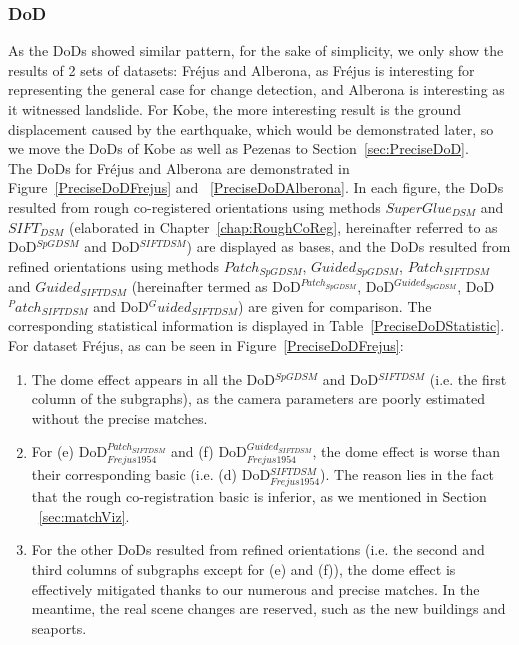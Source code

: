 \subsubsection{DoD}

As the \ac{DoD}s showed similar pattern, for the sake of simplicity, 
we only show the results of 2 sets of datasets: Fr{\'e}jus and Alberona, as Fr{\'e}jus is interesting for representing the general case for change detection, and Alberona is interesting as it witnessed landslide. 
For Kobe, the more interesting result is the ground displacement caused by the earthquake, which would be demonstrated later, so we move the \ac{DoD}s of Kobe as well as Pezenas to Section~\ref{sec:PreciseDoD}.\\

The \ac{DoD}s for Fr{\'e}jus and Alberona are demonstrated in Figure~\ref{PreciseDoDFrejus} and ~\ref{PreciseDoDAlberona}. 
In each figure, the \ac{DoD}s resulted from rough co-registered orientations using methods $SuperGlue_{DSM}$ and $SIFT_{DSM}$ (elaborated in Chapter~\ref{chap:RoughCoReg}, hereinafter referred to as DoD$^{SpGDSM}$ and DoD$^{SIFTDSM}$) are displayed as bases, and the \ac{DoD}s resulted from refined orientations using methods $Patch_{SpGDSM}$, $Guided_{SpGDSM}$, $Patch_{SIFTDSM}$ and $Guided_{SIFTDSM}$ (hereinafter termed as DoD$^{Patch_{SpGDSM}}$, DoD$^{Guided_{SpGDSM}}$, DoD$^Patch_{SIFTDSM}$ and DoD$^Guided_{SIFTDSM}$) are given for comparison. 
The corresponding statistical information is displayed in Table~\ref{PreciseDoDStatistic}.\\

For dataset Fr{\'e}jus, as can be seen in Figure~\ref{PreciseDoDFrejus}:\\
\begin{enumerate}
	\item The dome effect appears in all the DoD$^{SpGDSM}$ and DoD$^{SIFTDSM}$ (i.e. the first column of the subgraphs), as the camera parameters are poorly estimated without the precise matches.
	\item For (e) \ac{DoD}$_{Frejus1954}^{Patch_{SIFTDSM}}$ and (f) \ac{DoD}$_{Frejus1954}^{Guided_{SIFTDSM}}$, the dome effect is worse than their corresponding basic (i.e. (d) \ac{DoD}$_{Frejus1954}^{{SIFTDSM}}$).  The reason lies in the fact that the rough co-registration basic is inferior, as we mentioned in Section ~\ref{sec:matchViz}.
	\item For the other \ac{DoD}s resulted from refined orientations (i.e. the second and third columns of subgraphs except for (e) and (f)), the dome effect is effectively mitigated thanks to our numerous and precise matches. In the meantime, the real scene changes are reserved, such as the new buildings and seaports.
\end{enumerate}

